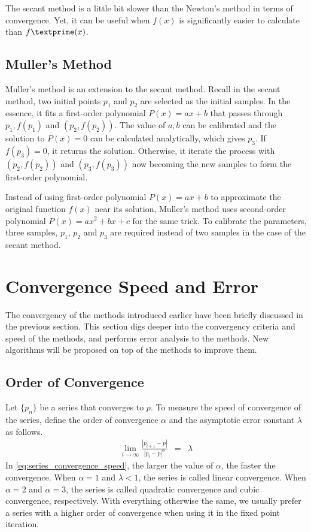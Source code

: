 The secant method is a little bit slower than the Newton's method in terms of convergence. Yet, it can be useful when $f(x)$ is significantly easier to calculate than $f\textprime(x)$.

\subsection{Muller's Method}

Muller's method is an extension to the secant method. Recall in the secant method, two initial points $p_1$ and $p_2$ are selected as the initial samples. In the essence, it fits a first-order polynomial $P(x)=ax+b$ that passes through $p_1, f(p_1)$ and $(p_2, f(p_2))$. The value of $a, b$ can be calibrated and the solution to $P(x)=0$ can be calculated analytically, which gives $p_3$. If $f(p_3)=0$, it returns the solution. Otherwise, it iterate the process with $(p_2, f(p_2))$ and $(p_3, f(p_3))$ now becoming the new samples to form the first-order polynomial.

Instead of using first-order polynomial $P(x)=ax + b$ to approximate the original function $f(x)$ near its solution, Muller's method uses second-order polynomial $P(x)=ax^2+bx+c$ for the same trick. To calibrate the parameters, three samples, $p_1$, $p_2$ and $p_3$ are required instead of two samples in the case of the secant method.

\section{Convergence Speed and Error}

The convergency of the methods introduced earlier have been briefly discussed in the previous section. This section digs deeper into the convergency criteria and speed of the methods, and performs error analysis to the methods. New algorithms will be proposed on top of the methods to improve them.

\subsection{Order of Convergence}

Let $\{p_n\}$ be a series that converges to $p$. To measure the speed of convergence of the series, define the order of convergence $\alpha$ and the asymptotic error constant $\lambda$ as follows.
\begin{eqnarray}
  \lim_{i\rightarrow\infty} \frac{|p_{i+1}-p|}{|p_i-p|^\alpha} &=& \lambda \label{eq:series_convergence_speed}
\end{eqnarray}
In \eqref{eq:series_convergence_speed}, the larger the value of $\alpha$, the faster the convergence. When $\alpha=1$ and $\lambda < 1$, the series is called linear convergence. When $\alpha=2$ and $\alpha=3$, the series is called quadratic convergence and cubic convergence, respectively. With everything otherwise the same, we usually prefer a series with a higher order of convergence when using it in the fixed point iteration.

